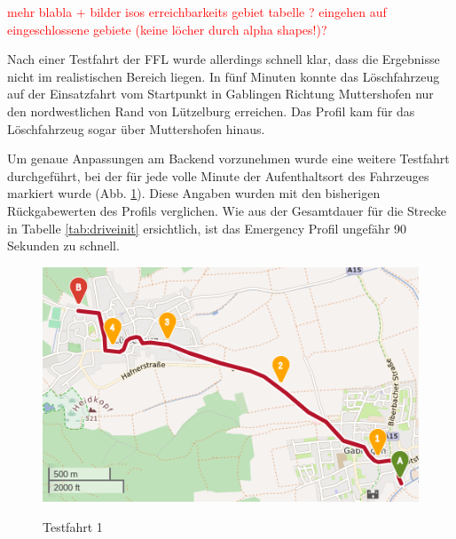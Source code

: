 \documentclass[12pt,a4paper]{article}
\newcommand\todo[1]{\textcolor{red}{#1}}
\begin{document}
\todo{
mehr blabla
+ bilder isos 
erreichbarkeits gebiet tabelle ?
eingehen auf eingeschlossene gebiete (keine löcher durch alpha shapes!)?
}

Nach einer Testfahrt der FFL wurde allerdings schnell klar, dass die Ergebnisse nicht im realistischen Bereich liegen. In fünf Minuten konnte das Löschfahrzeug auf der Einsatzfahrt vom Startpunkt in Gablingen Richtung Muttershofen nur den nordwestlichen Rand von Lützelburg erreichen. Das Profil kam für das Löschfahrzeug sogar über Muttershofen hinaus.



Um genaue Anpassungen am Backend vorzunehmen wurde eine weitere Testfahrt durchgeführt, bei der für jede volle Minute der Aufenthaltsort des Fahrzeuges markiert wurde (Abb. \ref{fig:drive1}).
Diese Angaben wurden mit den bisherigen Rückgabewerten des Profils verglichen.
Wie aus der Gesamtdauer für die Strecke in Tabelle \ref{tab:driveinit} ersichtlich, ist das Emergency Profil ungefähr 90 Sekunden zu schnell.

\begin{figure}[h]
\centering
\includegraphics[width = 0.7 \textwidth]{../media/Fahrt1.png} \\
\caption{Testfahrt 1}
\label{fig:drive1}
\end{figure}
\end{document}

